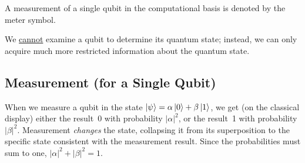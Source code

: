 \documentclass[10pt,a4paper]{article}
\begin{document}
\begin{tcolorbox}[defstyle, title={Measurement}]
A measurement of a single qubit in the computational basis is denoted by the meter symbol.

\begin{center}
\end{center}

\end{tcolorbox}

We \uline{cannot} examine a qubit to determine its quantum state; instead, we can only acquire much more restricted information about the quantum state.

\subsection{Measurement (for a Single Qubit)}

\begin{tcolorbox}[propstyle, title={Postulate}]
When we measure a qubit in the state $\ket{\psi}=\alpha\ket{0}+\beta\ket{1}$, we get (on the classical display) either the result~0 with probability $|\alpha|^2$, or the result~1 with probability $|\beta|^2$. Measurement \emph{changes} the state, collapsing it from its superposition to the specific state consistent with the measurement result. Since the probabilities must sum to one, $|\alpha|^2+|\beta|^2=1$.
\end{tcolorbox}
\end{document}
